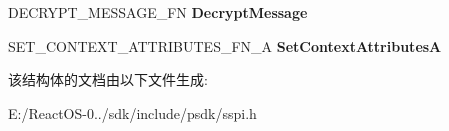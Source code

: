 \begin{DoxyCompactItemize}
\mbox{\label{struct___s_e_c_u_r_i_t_y___f_u_n_c_t_i_o_n___t_a_b_l_e___a_ad8b911dfb5d0bc79f3256e689a4367c4}} 
D\+E\+C\+R\+Y\+P\+T\+\_\+\+M\+E\+S\+S\+A\+G\+E\+\_\+\+FN {\bfseries Decrypt\+Message}
\item 
\mbox{\label{struct___s_e_c_u_r_i_t_y___f_u_n_c_t_i_o_n___t_a_b_l_e___a_ad656675740f2fb2cb728c647b47f1061}} 
S\+E\+T\+\_\+\+C\+O\+N\+T\+E\+X\+T\+\_\+\+A\+T\+T\+R\+I\+B\+U\+T\+E\+S\+\_\+\+F\+N\+\_\+A {\bfseries Set\+Context\+AttributesA}
\end{DoxyCompactItemize}


该结构体的文档由以下文件生成\+:\begin{DoxyCompactItemize}
\item 
E\+:/\+React\+O\+S-\/0../sdk/include/psdk/sspi.\+h\end{DoxyCompactItemize}
